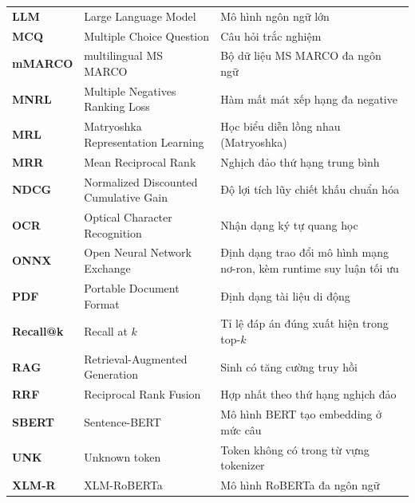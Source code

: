 \documentclass[../DoAn.tex]{subfiles}
\begin{document}
\begin{longtable}{>{\raggedright\arraybackslash}p{2cm} >{\raggedright\arraybackslash}p{5.2cm} >{\raggedright\arraybackslash}p{6.5cm}}
	\textbf{LLM} & Large Language Model & Mô hình ngôn ngữ lớn \\
	\textbf{MCQ} & Multiple Choice Question & Câu hỏi trắc nghiệm \\
	\textbf{mMARCO} & multilingual MS MARCO & Bộ dữ liệu MS MARCO đa ngôn ngữ \\
	\textbf{MNRL} & Multiple Negatives Ranking Loss & Hàm mất mát xếp hạng đa negative \\
	\textbf{MRL} & Matryoshka Representation Learning & Học biểu diễn lồng nhau (Matryoshka) \\
	\textbf{MRR} & Mean Reciprocal Rank & Nghịch đảo thứ hạng trung bình \\
	\textbf{NDCG} & Normalized Discounted Cumulative Gain & Độ lợi tích lũy chiết khấu chuẩn hóa \\
	\textbf{OCR} & Optical Character Recognition & Nhận dạng ký tự quang học \\
	\textbf{ONNX} & Open Neural Network Exchange & Định dạng trao đổi mô hình mạng nơ-ron, kèm runtime suy luận tối ưu \\
	\textbf{PDF} & Portable Document Format & Định dạng tài liệu di động \\
	\textbf{Recall@k} & Recall at $k$ & Tỉ lệ đáp án đúng xuất hiện trong top-$k$ \\
	\textbf{RAG} & Retrieval-Augmented Generation & Sinh có tăng cường truy hồi \\
	\textbf{RRF} & Reciprocal Rank Fusion & Hợp nhất theo thứ hạng nghịch đảo \\
	\textbf{SBERT} & Sentence-BERT & Mô hình BERT tạo embedding ở mức câu \\
	\textbf{UNK} & Unknown token & Token không có trong từ vựng tokenizer \\
	\textbf{XLM-R} & XLM-RoBERTa & Mô hình RoBERTa đa ngôn ngữ \\
	\hline
\end{longtable}
\endgroup
\end{document}
